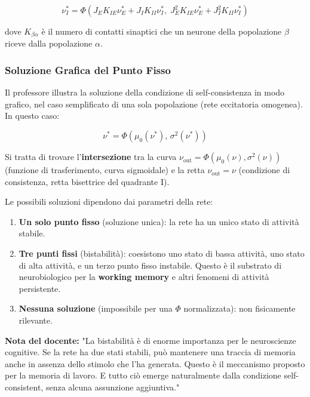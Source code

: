 \begin{equation}
\nu_I^* = \Phi\!\left(J_E K_{IE} \nu_E^* + J_I K_{II} \nu_I^*,\; J_E^2 K_{IE} \nu_E^* + J_I^2 K_{II} \nu_I^*\right)
\end{equation}

dove $K_{\beta\alpha}$ è il numero di contatti sinaptici che un neurone della popolazione $\beta$ riceve dalla popolazione $\alpha$.

\subsubsection{Soluzione Grafica del Punto Fisso}

Il professore illustra la soluzione della condizione di self-consistenza in modo grafico, nel caso semplificato di una sola popolazione (rete eccitatoria omogenea). In questo caso:

\begin{equation}
\nu^* = \Phi\!\left(\mu_0(\nu^*),\, \sigma^2(\nu^*)\right)
\end{equation}

Si tratta di trovare l'\textbf{intersezione} tra la curva $\nu_{\text{out}} = \Phi(\mu_0(\nu), \sigma^2(\nu))$ (funzione di trasferimento, curva sigmoidale) e la retta $\nu_{\text{out}} = \nu$ (condizione di consistenza, retta bisettrice del quadrante I).

Le possibili soluzioni dipendono dai parametri della rete:
\begin{enumerate}
    \item \textbf{Un solo punto fisso} (soluzione unica): la rete ha un unico stato di attività stabile.
    \item \textbf{Tre punti fissi} (bistabilità): coesistono uno stato di bassa attività, uno stato di alta attività, e un terzo punto fisso instabile. Questo è il substrato di neurobiologico per la \textbf{working memory} e altri fenomeni di attività persistente.
    \item \textbf{Nessuna soluzione} (impossibile per una $\Phi$ normalizzata): non fisicamente rilevante.
\end{enumerate}

\begin{tcolorbox}[colback=gray!5, colframe=gray!40, arc=2mm, boxrule=0.5pt]
\textbf{Nota del docente:} "La bistabilità è di enorme importanza per le neuroscienze cognitive. Se la rete ha due stati stabili, può mantenere una traccia di memoria anche in assenza dello stimolo che l'ha generata. Questo è il meccanismo proposto per la memoria di lavoro. E tutto ciò emerge naturalmente dalla condizione self-consistent, senza alcuna assunzione aggiuntiva."
\end{tcolorbox}

